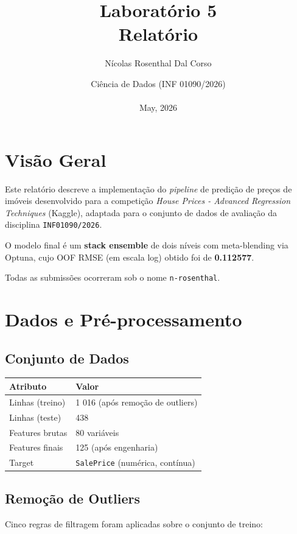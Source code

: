 \documentclass[12pt,a4paper]{article}
\author{Nícolas Rosenthal Dal Corso}
\date{Ciência de Dados (INF 01090/2026) \\\\ May, 2026}
\title{Laboratório 5 \\ Relatório}
\begin{document}
\maketitle
\setcounter{tocdepth}{3}
\tableofcontents

\section{Visão Geral}
\label{sec:org740da2d}

Este relatório descreve a implementação do \emph{pipeline} de predição de preços de
imóveis desenvolvido para a competição \emph{House Prices - Advanced Regression
Techniques} (Kaggle), adaptada para o conjunto de dados de avaliação da
disciplina \texttt{INF01090/2026}.

O modelo final é um \textbf{stack ensemble} de dois níveis com meta-blending via
Optuna, cujo OOF RMSE (em escala log) obtido foi de \textbf{0.112577}.

Todas as submissões ocorreram sob o nome \texttt{n-rosenthal}.
\section{Dados e Pré-processamento}
\label{sec:orgba46b6b}

\subsection{Conjunto de Dados}
\label{sec:org8b6382b}

\begin{center}
\begin{tabular}{ll}
Atributo & Valor\\
\hline
Linhas (treino) & 1 016 (após remoção de outliers)\\
Linhas (teste) & 438\\
Features brutas & 80 variáveis\\
Features finais & 125 (após engenharia)\\
Target & \texttt{SalePrice} (numérica, contínua)\\
\end{tabular}
\end{center}
\subsection{Remoção de Outliers}
\label{sec:orgcb8dd11}

Cinco regras de filtragem foram aplicadas sobre o conjunto de treino:
\end{document}
